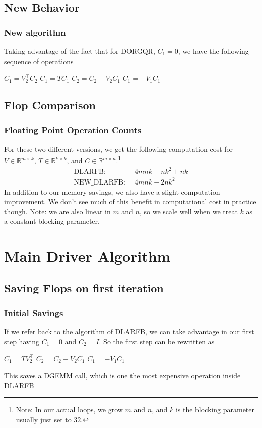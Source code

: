 \documentclass[12pt]{beamer}
\newcommand{\R}{\mathbb{R}}
\begin{document}
    \subsection{New Behavior}
    \begin{frame}
        \frametitle{New algorithm}
        Taking advantage of the fact that for DORGQR, $C_1 = 0$, we have the following sequence of operations
        \begin{algorithmic}[1]
            \State $C_1 = V_2^\top C_2$
            \State $C_1 = TC_1$
            \State $C_2 = C_2 - V_2C_1$
            \State $C_1 =     - V_1C_1$
        \end{algorithmic}
    \end{frame}
    \subsection{Flop Comparison}
    \begin{frame}
        \frametitle{Floating Point Operation Counts}
        For these two different versions, we get the following computation cost for $V\in\R^{m\times k}$, $T\in\R^{k\times k}$, and $C\in\R^{m\times n}$.\footnote{Note: In our actual loops, we grow $m$ and $n$, and $k$ is the blocking parameter usually just set to $32$.}
        \begin{align*}
            \text{DLARFB: }&\, 4mnk - nk^2 + nk\\
            \text{NEW\_DLARFB: }&\, 4mnk - 2nk^2
        \end{align*}
        In addition to our memory savings, we also have a slight computation improvement. We don't see
        much of this benefit in computational cost in practice though. Note: we are also linear in $m$ and
        $n$, so we scale well when we treat $k$ as a constant blocking parameter.
    \end{frame}
    \section{Main Driver Algorithm}
    \subsection{Saving Flops on first iteration}
    \begin{frame}
        \frametitle{Initial Savings}
        If we refer back to the algorithm of DLARFB, we can take advantage in our first step having $C_1 = 0$ and $C_2=I$. So 
        the first step can be rewritten as
        \begin{algorithmic}[1]
            \State $C_1 = TV_2^\top$
            \State $C_2 = C_2 - V_2C_1$
            \State $C_1 =     - V_1C_1$
        \end{algorithmic}
        This saves a DGEMM call, which is one the most expensive operation inside DLARFB
    \end{frame}
\end{document}
